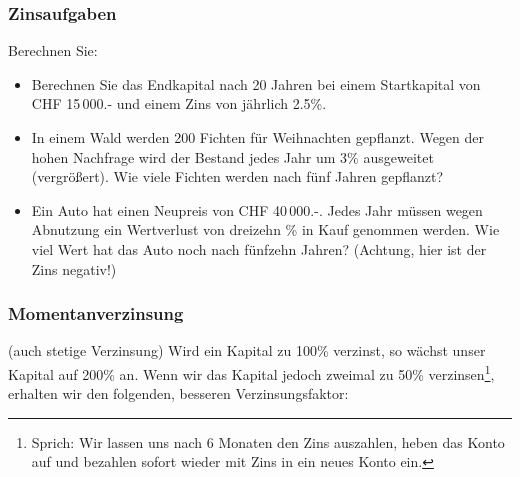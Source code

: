 \subsubsection{Zinsaufgaben}

Berechnen Sie:

\begin{itemize}
  \item Berechnen Sie das Endkapital nach 20 Jahren bei einem
  Startkapital von CHF 15\,000.- und einem Zins von jährlich
  2.5\%.\\%

\item In einem Wald werden 200 Fichten für Weihnachten
  gepflanzt. Wegen der hohen Nachfrage wird der Bestand jedes Jahr um
  3\% ausgeweitet (vergrößert).
  Wie viele Fichten werden nach fünf Jahren gepflanzt?




\item Ein Auto hat einen Neupreis von CHF 40\,000.-. Jedes Jahr müssen
wegen Abnutzung ein Wertverlust von dreizehn \% in Kauf
  genommen werden. Wie viel Wert hat das Auto noch nach fünfzehn Jahren? (Achtung, hier ist der Zins negativ!)

\end{itemize}


\newpage


\subsubsection{Momentanverzinsung}
(auch stetige Verzinsung)
Wird ein Kapital zu 100\% verzinst, so wächst unser Kapital auf 200\%
an. Wenn wir das Kapital jedoch zweimal zu 50\%
verzinsen\footnote{Sprich: Wir lassen uns nach 6 Monaten den Zins
auszahlen, heben das Konto auf und bezahlen sofort wieder mit Zins in
ein neues Konto ein.}, erhalten wir den folgenden, besseren Verzinsungsfaktor:

